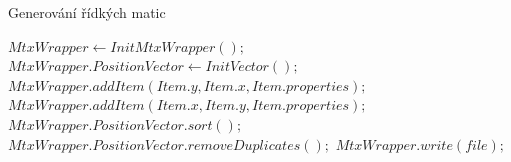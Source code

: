 \begin{algorithm}[htb]
	\caption{Generování řídkých matic}\label{mmm-recursive}
	\begin{algorithmic}[1]
		\State \texttt{$MtxWrapper \gets InitMtxWrapper();$}
		\State \texttt{$MtxWrapper.PositionVector \gets InitVector();$}	
			\State \texttt{$MtxWrapper.addItem(Item.y, Item.x, Item.properties);$}
				\State \texttt{$MtxWrapper.addItem(Item.x, Item.y, Item.properties);$}
			\EndIf
		\EndFor
		\State \texttt{$MtxWrapper.PositionVector.sort();$}
		\State \texttt{$MtxWrapper.PositionVector.removeDuplicates();$}
		\State \texttt{$MtxWrapper.write(file);$}
		\EndProcedure
	\end{algorithmic}
\end{algorithm}


% 

